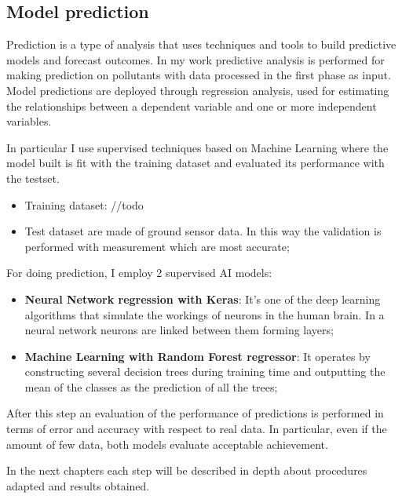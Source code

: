 \subsection{Model prediction}
Prediction is a type of analysis that uses techniques and tools to build predictive models and forecast outcomes. In my work predictive analysis is performed for making prediction on pollutants with data processed in the first phase as input.\newline
Model predictions are deployed through regression analysis, used for estimating the relationships between a dependent variable and one or more independent variables.\par
In particular I use supervised techniques based on Machine Learning where the model built is fit with the training dataset and evaluated its performance with the testset.
\begin{itemize}
\item Training dataset: //todo  
\item Test dataset are made of ground sensor data. In this way the validation is performed with measurement which are most accurate;
\end{itemize}
For doing prediction, I employ 2 supervised AI models:
\begin{itemize}
\item \textbf{Neural Network regression with Keras}: It's one of the deep learning algorithms that simulate the workings of neurons in the human brain. In a neural network neurons are linked between them forming layers; 
\item \textbf{Machine Learning with Random Forest regressor}: It operates by constructing several decision trees during training time and outputting the mean of the classes as the prediction of all the trees;
\end{itemize}
After this step an evaluation of the performance of predictions is performed in terms of error and accuracy with respect to real data.\newline
In particular, even if the amount of few data, both models evaluate acceptable achievement.\par
In the next chapters each step will be described in depth about procedures adapted and results obtained.